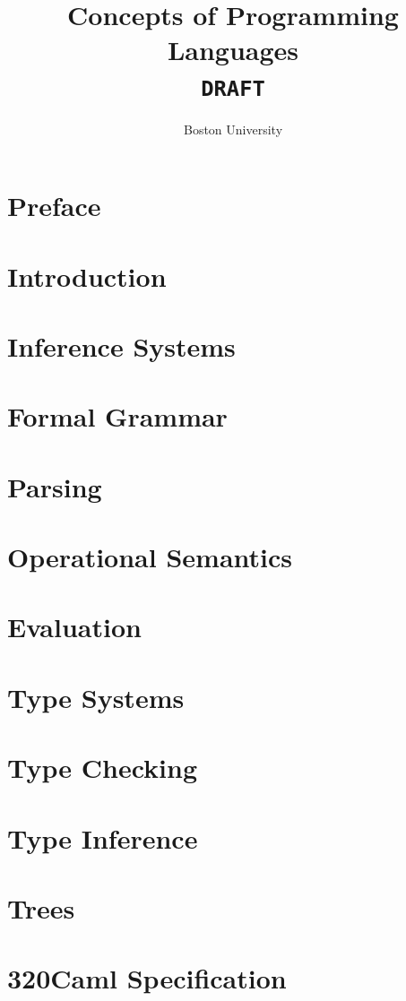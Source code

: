 \documentclass[10pt]{report}
\title{Concepts of Programming Languages
  \\
  \texttt{DRAFT}
}
\author{Boston University}
\begin{document}
\maketitle
\tableofcontents

\chapter*{Preface}


\chapter{Introduction}\label{ch:intro}



\chapter{Inference Systems}\label{ch:infer}


\chapter{Formal Grammar}


\chapter{Parsing}


\chapter{Operational Semantics}


\chapter{Evaluation}


\chapter{Type Systems}\label{ch:type-systems}


\chapter{Type Checking}


\chapter{Type Inference}


\appendix

\chapter{Trees}\label{ch:trees}


\chapter{320Caml Specification}




\end{document}
